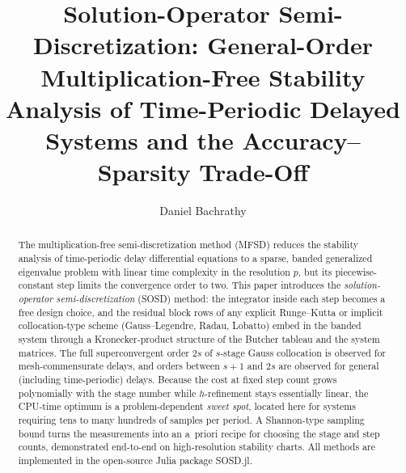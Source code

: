 \documentclass[Afour,sageh,times]{sagej}
\begin{document}

\title{Solution-Operator Semi-Discretization: General-Order
Multiplication-Free Stability Analysis of Time-Periodic Delayed Systems and
the Accuracy--Sparsity Trade-Off}

\author{Daniel Bachrathy}




\begin{abstract}
The multiplication-free semi-discretization method (MFSD) reduces the
stability analysis of time-periodic delay differential equations to a sparse,
banded generalized eigenvalue problem with linear time complexity in the
resolution $p$, but its piecewise-constant step limits the convergence order
to two. This paper introduces the \emph{solution-operator semi-discretization}
(SOSD) method: the integrator inside each step becomes a free design choice,
and the residual block rows of any explicit Runge--Kutta or implicit
collocation-type scheme (Gauss--Legendre, Radau, Lobatto) embed in the banded
system through a Kronecker-product structure of the Butcher tableau and the
system matrices. The full superconvergent order $2s$ of $s$-stage Gauss
collocation is observed for mesh-commensurate delays, and orders between
$s{+}1$ and $2s$ are observed for general (including time-periodic) delays.
Because the cost at fixed step count grows polynomially with the stage number
while $h$-refinement stays essentially linear, the CPU-time optimum is a
problem-dependent \emph{sweet spot}, located here for systems requiring tens
to many hundreds of samples per period. A Shannon-type sampling bound turns
the measurements into an a~priori recipe for choosing the stage and step
counts, demonstrated end-to-end on high-resolution stability charts. All
methods are implemented in the open-source Julia package \textsf{SOSD.jl}.
\end{abstract}

\end{document}
